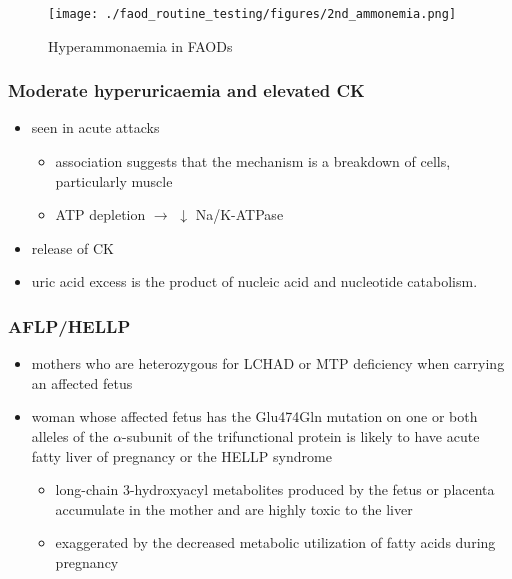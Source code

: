 \documentclass{scrartcl}
\begin{document}
\begin{figure}[htbp]
\centering
\texttt{[image: ./faod\_routine\_testing/figures/2nd\_ammonemia.png]}
\caption{\label{fig:org11e252b}
Hyperammonaemia in FAODs}
\end{figure}


\subsubsection{Moderate hyperuricaemia and elevated CK}
\label{sec:orge249c52}
\begin{itemize}
\item seen in acute attacks 
\begin{itemize}
\item association suggests that the mechanism is a breakdown of
cells, particularly muscle
\item ATP depletion \(\to\) \(\downarrow\) Na/K-ATPase
\end{itemize}
\item release of CK
\item uric acid excess is the product of nucleic acid and nucleotide catabolism.
\end{itemize}

\subsubsection{AFLP/HELLP}
\label{sec:orga2b4cdd}
\begin{itemize}
\item mothers who are heterozygous for LCHAD or MTP deficiency when
carrying an affected fetus
\item woman whose affected fetus has the Glu474Gln mutation on one or
both alleles of the \(\alpha\)-subunit of the trifunctional protein is
likely to have acute fatty liver of pregnancy or the HELLP syndrome 
\begin{itemize}
\item long-chain 3-hydroxyacyl metabolites produced by the fetus or
placenta accumulate in the mother and are highly toxic to the liver
\item exaggerated by the decreased metabolic utilization of fatty acids
during pregnancy
\end{itemize}
\end{itemize}
\end{document}
